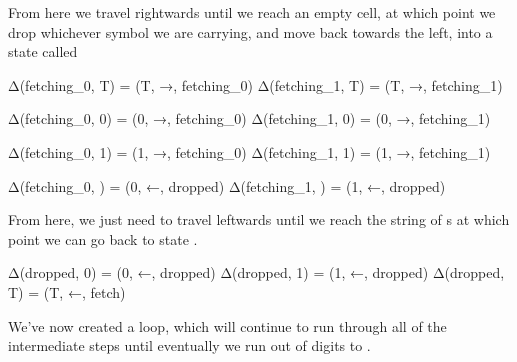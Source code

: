 From here we travel rightwards until we reach an empty cell, at which point we drop whichever symbol we are carrying, and move back towards the left, into a state called 
\begin{stdout}
Δ(fetching_0, T) = (T, →, fetching_0)
Δ(fetching_1, T) = (T, →, fetching_1)

Δ(fetching_0, 0) = (0, →, fetching_0)
Δ(fetching_1, 0) = (0, →, fetching_1)

Δ(fetching_0, 1) = (1, →, fetching_0)
Δ(fetching_1, 1) = (1, →, fetching_1)

Δ(fetching_0, ) = (0, ←, dropped)
Δ(fetching_1, ) = (1, ←, dropped)
\end{stdout}
\begin{center}
\end{center}
From here, we just need to travel leftwards until we reach the string of s at which point we can go back to state .
\begin{stdout}
Δ(dropped, 0) = (0, ←, dropped)
Δ(dropped, 1) = (1, ←, dropped)
Δ(dropped, T) = (T, ←, fetch)
\end{stdout}
We've now created a loop, which will continue to run through all of the intermediate steps until eventually we run out of digits to .

